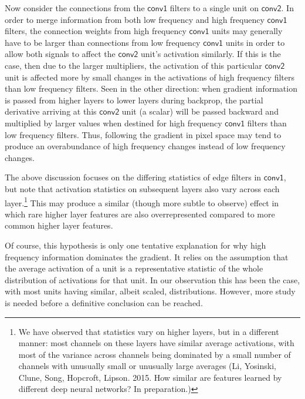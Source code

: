 \documentclass{article}
\newcommand{\layer}[1]{\ensuremath{\mathsf{#1}\xspace}}
\begin{document}

Now consider the connections from the \layer{conv1} filters to a single unit on \layer{conv2}.
In order to merge information from both low frequency and high frequency \layer{conv1} filters, the connection weights from high frequency \layer{conv1} units may generally have to be larger than connections from low frequency \layer{conv1} units in order to allow both signals to affect the \layer{conv2} unit's activation similarly.
If this is the case, then due to the larger multipliers, the activation of this particular \layer{conv2} unit is affected more by small changes in the activations of high frequency filters than low frequency filters. Seen in the other direction: when gradient information is passed from higher layers to lower layers during backprop, the partial derivative arriving at this \layer{conv2} unit (a scalar) will be passed backward and multiplied by larger values when destined for high frequency \layer{conv1} filters than low frequency filters. Thus, following the gradient in pixel space may tend to produce an overabundance of high frequency changes instead of low frequency changes.

The above discussion focuses on the differing statistics of edge filters in \layer{conv1}, but note that activation statistics on subsequent layers also vary across each layer.\footnote{We have observed that statistics vary on higher layers, but in a different manner: most channels  on these layers have similar average activations, with most of the variance across channels being dominated by a small number of channels with unusually small or unusually large averages (Li, Yosinski, Clune, Song, Hopcroft, Lipson. 2015. How similar are features learned by different deep neural networks? In preparation.)} This may produce a similar (though more subtle to observe) effect in which rare higher layer features are also overrepresented compared to more common higher layer features.

Of course, this hypothesis is only one tentative explanation for why high frequency information dominates the gradient. It relies on the assumption that the average activation of a unit is a representative statistic of the whole distribution of activations for that unit. In our observation this has been the case, with most units having similar, albeit scaled, distributions. However, more study is needed before a definitive conclusion can be reached.
\end{document}
